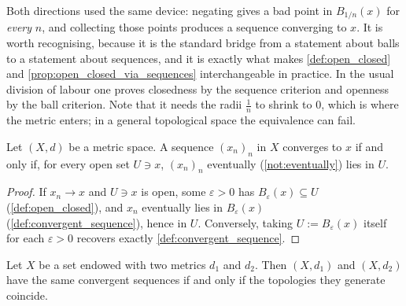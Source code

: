 \begin{remark}
\label{rem:shrinking_ball_trick}
Both \qt{$\Leftarrow$} directions used the same device: negating 
gives a bad point in $B_{1/n}(x)$ for \emph{every} $n$, and collecting those points produces a
sequence converging to $x$. It is worth recognising, because it is the standard bridge from a
statement about balls to a statement about sequences, and it is exactly what makes
\cref{def:open_closed} and \cref{prop:open_closed_via_sequences} interchangeable in practice. In
the usual division of labour one proves closedness by the sequence criterion and openness by the
ball criterion.
Note that it needs the radii $\tfrac1n$ to shrink to $0$, which is where the metric enters;
in a general topological space the equivalence can fail.
\end{remark}

\begin{lemma}
\label{lem:convergence_is_topological}
Let $(X,d)$ be a metric space. A sequence $(x_n)_n$ in $X$ converges to $x$ if and only if, for
every open set $U \ni x$, $(x_n)_n$ eventually (\cref{not:eventually}) lies in $U$.
\end{lemma}

\begin{proof}
If $x_n \to x$ and $U \ni x$ is open, some $\varepsilon>0$ has $B_\varepsilon(x)\subseteq U$
(\cref{def:open_closed}), and $x_n$ eventually lies in $B_\varepsilon(x)$
(\cref{def:convergent_sequence}), hence in $U$. Conversely, taking $U := B_\varepsilon(x)$ itself
for each $\varepsilon>0$ recovers exactly \cref{def:convergent_sequence}.
\end{proof}

\begin{corollary}
\label{cor:same_topology_same_convergence}
Let $X$ be a set endowed with two metrics $d_1$ and $d_2$. Then $(X,d_1)$ and $(X,d_2)$ have the
same convergent sequences if and only if the topologies they generate coincide.
\end{corollary}


